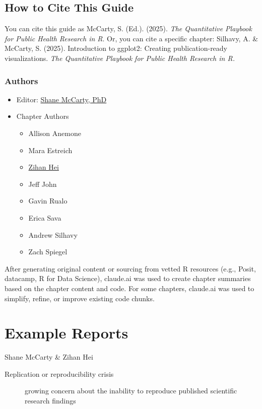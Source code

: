 \documentclass[
  english,
  letterpaper,
  DIV=11,
  numbers=noendperiod]{scrreprt}
\begin{document}
\section{How to Cite This Guide}\label{how-to-cite-this-guide}

You can cite this guide as McCarty, S. (Ed.). (2025). \emph{The
Quantitative Playbook for Public Health Research in R}. Or, you can cite
a specific chapter: Silhavy, A. \& McCarty, S. (2025). Introduction to
ggplot2: Creating publication-ready visualizations. \emph{The
Quantitative Playbook for Public Health Research in R.}

\subsection{Authors}\label{authors}

\begin{itemize}
\item
  Editor: \href{https://shane.quarto.pub}{Shane McCarty, PhD}
\item
  Chapter Authors

  \begin{itemize}
  \item
    Allison Anemone
  \item
    Mara Estreich
  \item
    \hyperref[0]{Zihan Hei}
  \item
    Jeff John
  \item
    Gavin Rualo
  \item
    Erica Sava
  \item
    Andrew Silhavy
  \item
    Zach Spiegel
  \end{itemize}
\end{itemize}

After generating original content or sourcing from vetted R resources
(e.g., Posit, datacamp, R for Data Science), claude.ai was used to
create chapter summaries based on the chapter content and code. For some
chapters, claude.ai was used to simplify, refine, or improve existing
code chunks.

\chapter{Example Reports}\label{example-reports}

Shane McCarty \& Zihan Hei

\hfill\break

\begin{description}
\item[Replication or reproducibility crisis]
growing concern about the inability to reproduce published scientific
research findings
\end{description}
\end{document}
